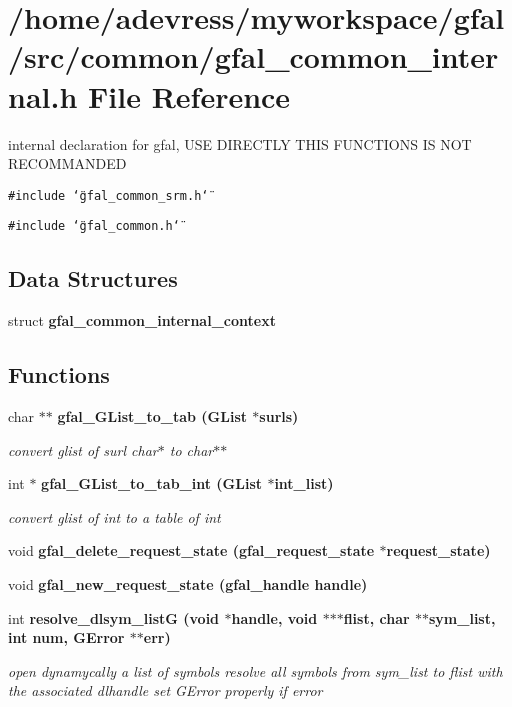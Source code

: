 \section{/home/adevress/myworkspace/gfal/src/common/gfal\_\-common\_\-internal.h File Reference}
\label{gfal__common__internal_8h}
internal declaration for gfal, USE DIRECTLY THIS FUNCTIONS IS NOT RECOMMANDED 

{\tt \#include \char`\"{}gfal\_\-common\_\-srm.h\char`\"{}}\par
{\tt \#include \char`\"{}gfal\_\-common.h\char`\"{}}\par
\subsection*{Data Structures}
\begin{CompactItemize}
\item 
struct \textbf{gfal\_\-common\_\-internal\_\-context}
\end{CompactItemize}
\subsection*{Functions}
\begin{CompactItemize}
\item 
char $\ast$$\ast$ \bf{gfal\_\-GList\_\-to\_\-tab} (GList $\ast$surls)
\begin{CompactList}\small\item\em convert glist of surl char$\ast$ to char$\ast$$\ast$ \item\end{CompactList}\item 
int $\ast$ \bf{gfal\_\-GList\_\-to\_\-tab\_\-int} (GList $\ast$int\_\-list)
\begin{CompactList}\small\item\em convert glist of int to a table of int \item\end{CompactList}\item 
void \bf{gfal\_\-delete\_\-request\_\-state} (\bf{gfal\_\-request\_\-state} $\ast$request\_\-state)
\item 
void \bf{gfal\_\-new\_\-request\_\-state} (gfal\_\-handle handle)
\item 
int \bf{resolve\_\-dlsym\_\-list\-G} (void $\ast$handle, void $\ast$$\ast$$\ast$flist, char $\ast$$\ast$sym\_\-list, int num, GError $\ast$$\ast$err)\label{gfal__common__internal_8h_4f7576e96249a32768cef374099f7b70}

\begin{CompactList}\small\item\em open dynamycally a list of symbols resolve all symbols from sym\_\-list to flist with the associated dlhandle set GError properly if error \item\end{CompactList}\end{CompactItemize}


